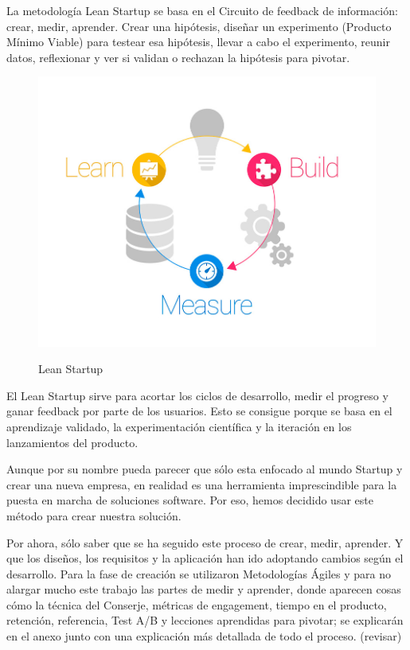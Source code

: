 \documentclass[12pt,twoside,titlepage]{report}
\begin{document}
La metodología Lean Startup se basa en el Circuito de feedback de información: crear, medir, aprender. Crear una hipótesis, diseñar un experimento (Producto Mínimo Viable) para testear esa hipótesis, llevar a cabo el experimento, reunir datos, reflexionar y ver si validan o rechazan la hipótesis para pivotar.

\begin{figure}[H]
    \centering
    \includegraphics[scale=0.3]{LeanStartup}
    \label{fig:LeanStartup}
    \caption{Lean Startup}
\end{figure}

El Lean Startup sirve para acortar los ciclos de desarrollo, medir el progreso y ganar feedback por parte de los usuarios. Esto se consigue porque se basa en el aprendizaje validado, la experimentación científica y la iteración en los lanzamientos del producto. 

Aunque por su nombre pueda parecer que sólo esta enfocado al mundo Startup y crear una nueva empresa, en realidad es una herramienta imprescindible para la puesta en marcha de soluciones software. Por eso, hemos decidido usar este método para crear nuestra solución.

Por ahora, sólo saber que se ha seguido este proceso de crear, medir, aprender. Y que los diseños, los requisitos y la aplicación han ido adoptando cambios según el desarrollo. Para la fase de creación se utilizaron Metodologías Ágiles y para no alargar mucho este trabajo las partes de medir y aprender, donde aparecen cosas cómo la técnica del Conserje, métricas de engagement, tiempo en el producto, retención, referencia, Test A/B y lecciones aprendidas para pivotar; se explicarán en el anexo junto con una explicación más detallada de todo el proceso. 
(revisar)
\end{document}
